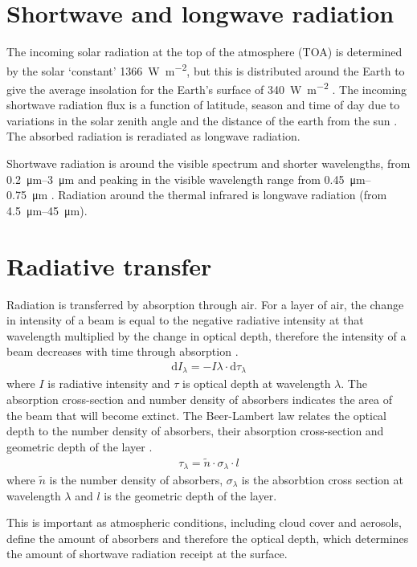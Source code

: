 \documentclass[a4paper,titlepage, twoside]{report}
\begin{document}
\section{Shortwave and longwave radiation}
The incoming solar radiation at the top of the atmosphere (TOA) is determined by the solar `constant' \SI{1366}{\watt\per\meter\squared}, but this is distributed around the Earth to give the average insolation for the Earth's surface of \SI{340}{\watt\per\meter\squared} \parencite{ambaum}.  The incoming shortwave radiation flux is a function of latitude, season and time of day due to variations in the solar zenith angle and the distance of the earth from the sun \parencite{ambaum}.  The absorbed radiation is reradiated as longwave radiation.

Shortwave radiation is around the visible spectrum and shorter wavelengths, from \SIrange{0.2}{3}{\micro\meter} and peaking in the visible wavelength range from \SIrange{0.45}{0.75}{\micro\meter} \parencite{salby}.  Radiation around the thermal infrared is longwave radiation (from \SIrange{4.5}{45}{\micro\meter}).

\section{Radiative transfer}
\label{sec:radiative-transfer}
Radiation is transferred by absorption through air. For a layer of air,  the change in intensity of a beam is equal to the negative radiative intensity at that wavelength multiplied by the change in optical depth, therefore the intensity of a beam decreases with time through absorption \parencite{ambaum}.
\begin{align}
\mathrm{d}I_\lambda = - I\lambda \cdot \mathrm{d} \tau_\lambda
\end{align}
where $I$ is radiative intensity and $\tau$ is optical depth at wavelength $\lambda$.
The absorption cross-section and number density of absorbers indicates the area of the beam that will become extinct. The Beer-Lambert law relates the optical depth to the number density of absorbers, their absorption cross-section and geometric depth of the layer \parencite{ambaum}.
\begin{align}
\tau_\lambda = \tilde{n} \cdot \sigma_\lambda \cdot l
\end{align}
where $\tilde{n}$ is the number density of absorbers, $\sigma_\lambda$ is the absorbtion cross section at wavelength $\lambda$ and $l$ is the geometric depth of the layer.

This is important as atmospheric conditions, including cloud cover and aerosols, define the amount of absorbers and therefore the optical depth, which determines the amount of shortwave radiation receipt at the surface.
\end{document}
